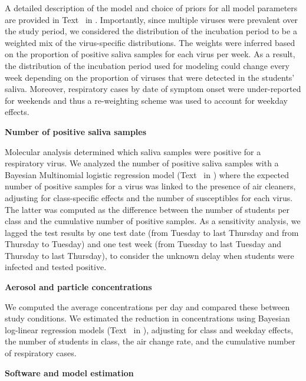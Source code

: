 \documentclass[fleqn,11pt]{wlscirep}
\begin{document}
A detailed description of the model and choice of priors for all model parameters are provided in Text~ in \supp. Importantly, since multiple viruses were prevalent over the study period, we considered the distribution of the incubation period to be a weighted mix of the virus-specific distributions. The weights were inferred based on the proportion of positive saliva samples for each virus per week. As a result, the distribution of the incubation period used for modeling could change every week depending on the proportion of viruses that were detected in the students' saliva. Moreover, respiratory cases by date of symptom onset were under-reported for weekends and thus a re-weighting scheme was used to account for weekday effects. \medskip

\noindent\textbf{Number of positive saliva samples} \smallskip

\noindent Molecular analysis determined which saliva samples were positive for a respiratory virus. We analyzed the number of positive saliva samples with a Bayesian Multinomial logistic regression model (Text~ in \supp) where the expected number of positive samples for a virus was linked to the presence of air cleaners, adjusting for class-specific effects and the number of susceptibles for each virus. The latter was computed as the difference between the number of students per class and the cumulative number of positive samples. As a sensitivity analysis, we lagged the test results by one test date (\ie from Tuesday to last Thursday and from Thursday to Tuesday) and one test week (\ie from Tuesday to last Tuesday and Thursday to last Thursday), to consider the unknown delay when students were infected and tested positive. 

\noindent\textbf{Aerosol and particle concentrations} \smallskip

\noindent We computed the average concentrations per day and compared these between study conditions. We estimated the reduction in concentrations using Bayesian log-linear regression models (Text~ in \supp), adjusting for class and weekday effects, the number of students in class, the air change rate, and the cumulative number of respiratory cases. \medskip


\noindent\textbf{Software and model estimation} \smallskip
\end{document}

